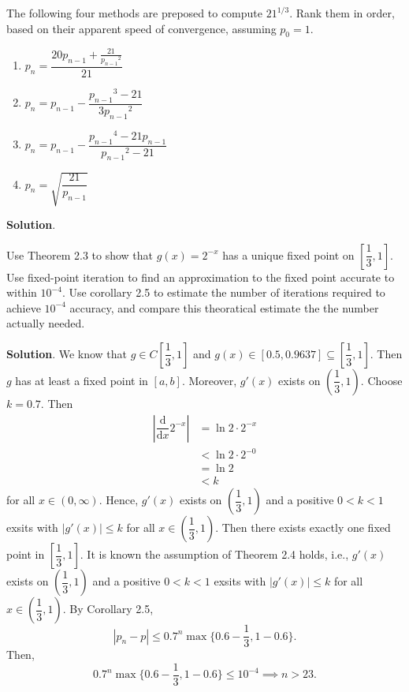 \documentclass[11pt]{article}
\theoremstyle{break}
\newcommand{\dd}{\text{d}}
\numberwithin{equation}{theorem}
\begin{document}
\newpage
\begin{problem}\label{problem 3}
    The following four methods are preposed to compute $21^{1/3}$. Rank them in order, based on their apparent speed of convergence, assuming $p_0=1$.
    \begin{enumerate}
        \item $p_n = \dfrac{20p_{n-1} + \frac{21}{{p_{n-1}}^2}}{21}$
        \item $p_n = p_{n-1} - \dfrac{{p_{n-1}}^3-21}{3{p_{n-1}}^2}$
        \item $p_n = p_{n-1} - \dfrac{{p_{n-1}}^4 - 21p_{n-1}}{{p_{n-1}}^2-21}$
        \item $p_n=\sqrt{\dfrac{21}{p_{n-1}}}$
    \end{enumerate}
\end{problem}
\textbf{Solution}.


\newpage
\begin{problem}\label{problem 4}
    Use Theorem 2.3 to show that $g(x)=2^{-x}$ has a unique fixed point on $\left[\dfrac{1}{3}, 1\right]$. Use fixed-point iteration to find an approximation to the fixed point accurate to within $10^{-4}$. Use corollary 2.5 to estimate the number of iterations required to achieve $10^{-4}$ accuracy, and compare this theoratical estimate the the number actually needed.
\end{problem}
\textbf{Solution}. We know that $g\in C\left[\dfrac{1}{3}, 1\right]$ and $g(x)\in[0.5, 0.9637]\subseteq\left[\dfrac{1}{3}, 1\right]$. Then $g$ has at least a fixed point in $[a, b]$. Moreover, $g'(x)$ exists on $\left(\dfrac{1}{3}, 1\right)$. Choose $k=0.7$. Then
\begin{align*}
    \left|\dfrac{\dd}{\dd x}2^{-x}\right|&=\ln2\cdot 2^{-x}\\
    &<\ln2\cdot 2^{-0}\\
    &=\ln2\\
    &<k
\end{align*}
for all $x\in(0, \infty)$. Hence, $g'(x)$ exists on $\left(\dfrac{1}{3}, 1\right)$ and a positive $0<k<1$ exsits with $\left|g'(x)\right|\leq k$ for all $x\in\left(\dfrac{1}{3}, 1\right)$. Then there exists exactly one fixed point in $\left[\dfrac{1}{3}, 1\right]$. It is known the assumption of Theorem 2.4 holds, i.e., $g'(x)$ exists on $\left(\dfrac{1}{3}, 1\right)$ and a positive $0<k<1$ exsits with $\left|g'(x)\right|\leq k$ for all $x\in\left(\dfrac{1}{3}, 1\right)$. By Corollary 2.5, 
\begin{equation*}
    |p_n-p|\leq 0.7^n\max\{0.6-\dfrac{1}{3}, 1-0.6\}.
\end{equation*}
Then,
\begin{equation*}
    0.7^n\max\{0.6-\dfrac{1}{3}, 1-0.6\}\leq 10^{-4} \implies n>23.
\end{equation*}
\end{document}
